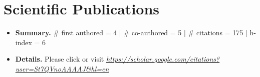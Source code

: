 \documentclass[11pt,a4paper,sans]{moderncv}        %
\begin{document}
 



\section{Scientific Publications}

\vspace{6pt}
 
\begin{itemize}

\item{\textbf{Summary.} \# first authored = 4 | \# co-authored = 5 | \# citations = 175 |  h-index = 6}
\vspace{6pt}
\item{\textbf{Details.} Please click or visit \href{https://scholar.google.com/citations?user=St7QVnoAAAAJ\&hl=en}{\textit{https://scholar.google.com/citations?user=St7QVnoAAAAJ\&hl=en}}}


\end{itemize}



\nocite{*}



\end{document}
